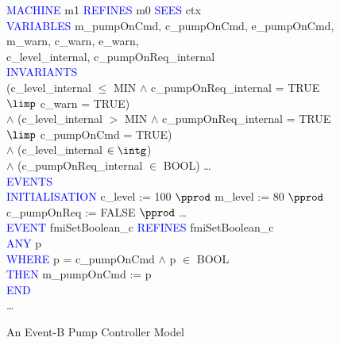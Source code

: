 \documentclass{llncs}%
\begin{document}
\begin{figure}
\centering
\begin{minipage}{0.95\textwidth}
\textcolor{blue}{MACHINE} m1 \textcolor{blue}{REFINES} m0 \textcolor{blue}{SEES} ctx \\
\textcolor{blue}{VARIABLES}  \hspace*{0.2cm} m\_pumpOnCmd, c\_pumpOnCmd, e\_pumpOnCmd, m\_warn, c\_warn, e\_warn,\\
\hspace*{0.2cm} c\_level\_internal, c\_pumpOnReq\_internal\\
\textcolor{blue}{INVARIANTS}\\
\hspace*{0.2cm}(c\_level\_internal $\leq$ MIN $\land$  c\_pumpOnReq\_internal = TRUE $\limp$  c\_warn = TRUE)\\
\hspace*{0.2cm} $\land$ (c\_level\_internal $>$  MIN $\land$  c\_pumpOnReq\_internal = TRUE\\
\hspace*{0.5cm} $\limp$  c\_pumpOnCmd = TRUE)\\
\hspace*{0.2cm} $\land$ (c\_level\_internal $\in  \intg$)\\
\hspace*{0.2cm} $\land$ (c\_pumpOnReq\_internal $\in$  BOOL) \ldots\\
\textcolor{blue}{EVENTS}\\
\textcolor{blue}{INITIALISATION} c\_level :=  100 $\pprod$ m\_level := 80 $\pprod$ c\_pumpOnReq :=  FALSE $\pprod$ \ldots\\
\textcolor{blue}{EVENT} fmiSetBoolean\_c \textcolor{blue}{REFINES} fmiSetBoolean\_c\\
\hspace*{0.2cm}\textcolor{blue}{ANY} p\\
\hspace*{0.2cm}\textcolor{blue}{WHERE} p = c\_pumpOnCmd $\land$ p $\in$ BOOL  \\
\hspace*{0.2cm}\textcolor{blue}{THEN} m\_pumpOnCmd :=  p\\
\hspace*{0.2cm}\textcolor{blue}{END}\\
\ldots
\end{minipage}
\caption{An Event-B  Pump Controller Model}
\label{fig:controllerSpec2}
\end{figure}
%
%
\end{document}

